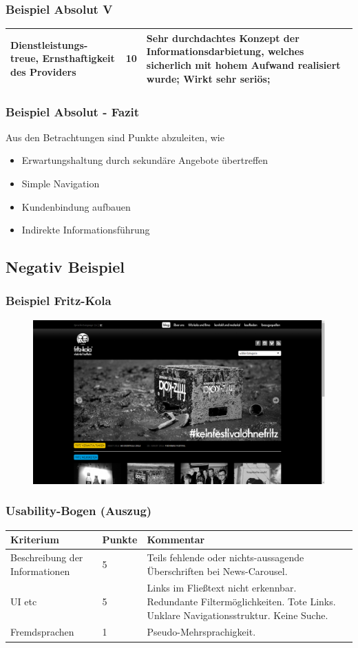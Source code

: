 \begin{frame}
	\frametitle{Beispiel Absolut V}
	\begin{tabular}{|p{}|l|p{6cm}|}
	\hline
	  Dienstleistungs- treue, Ernsthaftigkeit des Providers & 10 & Sehr durchdachtes Konzept der Informationsdarbietung, welches sicherlich mit hohem Aufwand realisiert wurde; Wirkt sehr seriös; \\ \hline
 	\end{tabular}
\end{frame}

\begin{frame}\frametitle{Beispiel Absolut - Fazit}
	Aus den Betrachtungen sind Punkte abzuleiten, wie 
	\begin{itemize}
		\item Erwartungshaltung durch sekundäre Angebote übertreffen
		\item Simple Navigation
		\item Kundenbindung aufbauen
		\item Indirekte Informationsführung
	\end{itemize}
\end{frame}

\subsection{Negativ Beispiel}
\begin{frame}
	\frametitle{Beispiel Fritz-Kola}
	\begin{figure}
	\includegraphics[scale=0.2]{bilder/fritz-kola.png}
	\end{figure}
\end{frame}

\begin{frame}
	\frametitle{Usability-Bogen (Auszug)}
	\begin{tabular}{|p{}|l|p{6cm}|}
	  \hline
	  Kriterium & Punkte & Kommentar \\ \hline
	  Beschreibung der Informationen & 5 & Teils fehlende oder nichts-aussagende Überschriften bei News-Carousel.  \\ \hline	
	  
	  UI etc & 5 & Links im Fließtext nicht erkennbar. Redundante Filtermöglichkeiten. Tote Links. Unklare Navigationsstruktur. Keine Suche.  \\ \hline		
	  Fremdsprachen & 1 & Pseudo-Mehrsprachigkeit.  \\ \hline		
	\end{tabular}
\end{frame}

